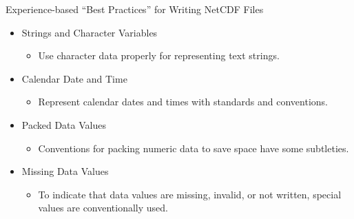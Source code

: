 \documentclass[compress,11pt,xcolor=svgnames,aspectratio=169]{beamer}
\begin{document}
\begin{frame}[t]{Experience-based ``Best Practices'' for Writing NetCDF Files}

    \begin{itemize}
    \setlength\itemsep{0.4cm}

        \item	Strings and Character Variables
        \begin{itemize}
          \item Use character data properly for representing text strings.
        \end{itemize}

        \item Calendar Date and Time
        \begin{itemize}
          \item Represent calendar dates and times with standards and conventions.
        \end{itemize}

        \item	Packed Data Values
        \begin{itemize}
          \item Conventions for packing numeric data to save space have some subtleties.
        \end{itemize}

        \item Missing Data Values
        \begin{itemize}
          \item To indicate that data values are missing, invalid, or not written, special values are conventionally used.
        \end{itemize}

    \end{itemize}

\end{frame}
\end{document}
